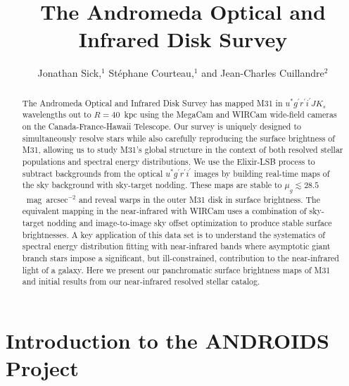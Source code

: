 \documentclass[11pt,twoside]{article}
\begin{document}
\title{The Andromeda Optical and Infrared Disk Survey}
\author{Jonathan Sick,$^1$ St\'{e}phane Courteau,$^1$ and Jean-Charles Cuillandre$^2$}

\begin{abstract}
The Andromeda Optical and Infrared Disk Survey has mapped M31 in $u^* g^\prime r^\prime i^\prime J K_s$ wavelengths out to $R=40$~kpc using the MegaCam and WIRCam wide-field cameras on the Canada-France-Hawaii Telescope.
Our survey is uniquely designed to simultaneously resolve stars while also carefully reproducing the surface brightness of M31, allowing us to study M31's global structure in the context of both resolved stellar populations and spectral energy distributions.
We use the Elixir-LSB process to subtract backgrounds from the optical $u^* g^\prime r^\prime i^\prime$ images by building real-time maps of the sky background with sky-target nodding.
These maps are stable to $\mu_g \lesssim 28.5$~mag~arcsec$^{-2}$ and reveal warps in the outer M31 disk in surface brightness.
The equivalent mapping in the near-infrared with WIRCam uses a combination of sky-target nodding and image-to-image sky offset optimization to produce stable surface brightnesses.
A key application of this data set is to understand the systematics of spectral energy distribution fitting with near-infrared bands where asymptotic giant branch stars impose a significant, but ill-constrained, contribution to the near-infrared light of a galaxy.
Here we present our panchromatic surface brightness maps of M31 and initial results from our near-infrared resolved stellar catalog.
\end{abstract}

\section{Introduction to the ANDROIDS Project}
\end{document}
